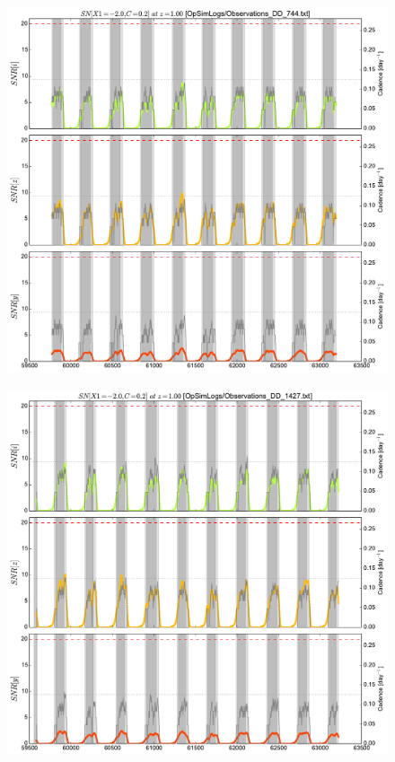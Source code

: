 \documentclass[\docopts]{\docclass}
\begin{document}
\begin{figure}[t]
  \begin{center}
    \includegraphics[width=\linewidth]{metric_DD_744.pdf}
    \caption{}
  \end{center}
\end{figure}


\begin{figure}[t]
  \begin{center}
    \includegraphics[width=\linewidth]{metric_DD_1427.pdf}
    \caption{}
  \end{center}
\end{figure}
\end{document}
